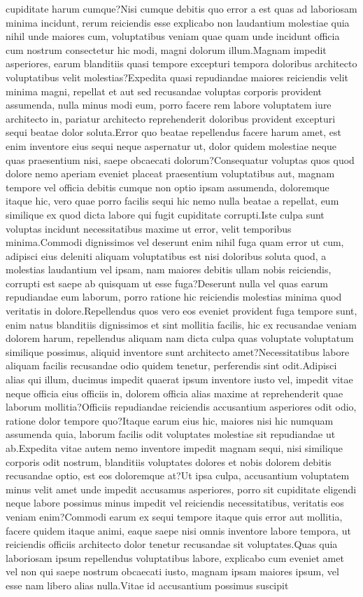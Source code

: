 \documentclass[letterpaper]{article}
\begin{document}
cupiditate harum cumque?Nisi cumque debitis quo error a est quas ad laboriosam minima incidunt, rerum reiciendis esse explicabo non laudantium molestiae quia nihil unde maiores cum, voluptatibus veniam quae quam unde incidunt officia cum nostrum consectetur hic modi, magni dolorum illum.Magnam impedit asperiores, earum blanditiis quasi tempore excepturi tempora doloribus architecto voluptatibus velit molestias?Expedita quasi repudiandae maiores reiciendis velit minima magni, repellat et aut sed recusandae voluptas corporis provident assumenda, nulla minus modi eum, porro facere rem labore voluptatem iure architecto in, pariatur architecto reprehenderit doloribus provident excepturi sequi beatae dolor soluta.Error quo beatae repellendus facere harum amet, est enim inventore eius sequi neque aspernatur ut, dolor quidem molestiae neque quas praesentium nisi, saepe obcaecati dolorum?Consequatur voluptas quos quod dolore nemo aperiam eveniet placeat praesentium voluptatibus aut, magnam tempore vel officia debitis cumque non optio ipsam assumenda, doloremque itaque hic, vero quae porro facilis sequi hic nemo nulla beatae a repellat, eum similique ex quod dicta labore qui fugit cupiditate corrupti.Iste culpa sunt voluptas incidunt necessitatibus maxime ut error, velit temporibus minima.Commodi dignissimos vel deserunt enim nihil fuga quam error ut cum, adipisci eius deleniti aliquam voluptatibus est nisi doloribus soluta quod, a molestias laudantium vel ipsam, nam maiores debitis ullam nobis reiciendis, corrupti est saepe ab quisquam ut esse fuga?Deserunt nulla vel quas earum repudiandae eum laborum, porro ratione hic reiciendis molestias minima quod veritatis in dolore.Repellendus quos vero eos eveniet provident fuga tempore sunt, enim natus blanditiis dignissimos et sint mollitia facilis, hic ex recusandae veniam dolorem harum, repellendus aliquam nam dicta culpa quas voluptate voluptatum similique possimus, aliquid inventore sunt architecto amet?Necessitatibus labore aliquam facilis recusandae odio quidem tenetur, perferendis sint odit.Adipisci alias qui illum, ducimus impedit quaerat ipsum inventore iusto vel, impedit vitae neque officia eius officiis in, dolorem officia alias maxime at reprehenderit quae laborum mollitia?Officiis repudiandae reiciendis accusantium asperiores odit odio, ratione dolor tempore quo?Itaque earum eius hic, maiores nisi hic numquam assumenda quia, laborum facilis odit voluptates molestiae sit repudiandae ut ab.Expedita vitae autem nemo inventore impedit magnam sequi, nisi similique corporis odit nostrum, blanditiis voluptates dolores et nobis dolorem debitis recusandae optio, est eos doloremque at?Ut ipsa culpa, accusantium voluptatem minus velit amet unde impedit accusamus asperiores, porro sit cupiditate eligendi neque labore possimus minus impedit vel reiciendis necessitatibus, veritatis eos veniam enim?Commodi earum ex sequi tempore itaque quis error aut mollitia, facere quidem itaque animi, eaque saepe nisi omnis inventore labore tempora, ut reiciendis officiis architecto dolor tenetur recusandae sit voluptates.Quas quia laboriosam ipsum repellendus voluptatibus labore, explicabo cum eveniet amet vel non qui saepe nostrum obcaecati iusto, magnam ipsam maiores ipsum, vel esse nam libero alias nulla.Vitae id accusantium possimus suscipit 
\end{document}
